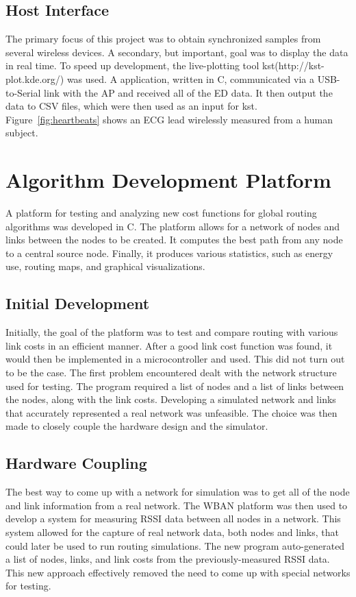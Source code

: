 \documentclass{article}
\begin{document}
\subsection{Host Interface}
The primary focus of this project was to obtain synchronized samples from several wireless devices. A secondary, but important, goal was to display the data in real time. To speed up development, the live-plotting tool kst(http://kst-plot.kde.org/) was used. A application, written in C, communicated via a USB-to-Serial link with the AP and received all of the ED data. It then output the data to CSV files, which were then used as an input for kst. Figure~\ref{fig:heartbeats} shows an ECG lead wirelessly measured from a human subject.



\section{Algorithm Development Platform}
A platform for testing and analyzing new cost functions for global routing algorithms was developed in C. The platform allows for a network of nodes and links between the nodes to be created. It computes the best path from any node to a central source node. Finally, it produces various statistics, such as energy use, routing maps, and graphical visualizations.

\subsection{Initial Development}
Initially, the goal of the platform was to test and compare routing with various link costs in an efficient manner. After a good link cost function was found, it would then be implemented in a microcontroller and used. This did not turn out to be the case. The first problem encountered dealt with the network structure used for testing. The program required a list of nodes and a list of links between the nodes, along with the link costs. Developing a simulated network and links that accurately represented a real network was unfeasible. The choice was then made to closely couple the hardware design and the simulator.

\subsection{Hardware Coupling}
The best way to come up with a network for simulation was to get all of the node and link information from a real network. The WBAN platform was then used to develop a system for measuring RSSI data between all nodes in a network. This system allowed for the capture of real network data, both nodes and links, that could later be used to run routing simulations. The new program auto-generated a list of nodes, links, and link costs from the previously-measured RSSI data. This new approach effectively removed the need to come up with special networks for testing. 
\end{document}
